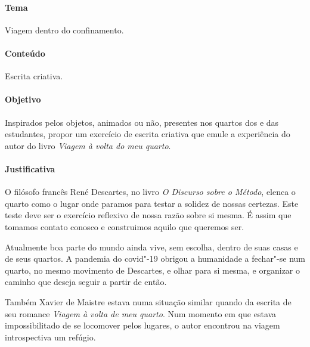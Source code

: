 \documentclass[12pt]{extarticle}
\begin{document}
\paragraph{Tema} Viagem dentro do confinamento. 

\paragraph{Conteúdo} Escrita criativa. 

\paragraph{Objetivo} Inspirados pelos objetos, animados ou não, 
presentes nos quartos dos e das estudantes, propor um exercício 
de escrita criativa que emule a experiência do autor do livro
\textit{Viagem à volta do meu quarto}.

\paragraph{Justificativa}
O filósofo francês René Descartes, no livro \textit{O Discurso sobre o Método}, 
elenca o quarto como o lugar onde paramos para testar a solidez de nossas certezas. 
Este teste deve ser o exercício reflexivo de nossa razão sobre si mesma. É assim
que tomamos contato conosco e construimos aquilo que queremos ser. 

Atualmente boa parte do mundo ainda vive, sem escolha, dentro de suas
casas e de seus quartos. A pandemia do covid"-19 obrigou a humanidade
a fechar"-se num quarto, no mesmo movimento de Descartes, e olhar para  
si mesma, e organizar o caminho que deseja seguir a partir de então. 

Também Xavier de Maistre estava numa situação similar quando da 
escrita de seu romance \textit{Viagem à volta de meu quarto}. 
Num momento em que estava impossibilitado de se locomover pelos
lugares, o autor encontrou na viagem introspectiva um refúgio. 
\end{document}
